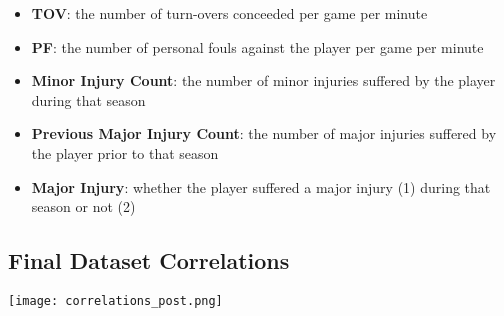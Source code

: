 \documentclass{article}
\begin{document}
\begin{itemize}
    \item \textbf{TOV}: the number of turn-overs conceeded per game per minute
    \item \textbf{PF}: the number of personal fouls against the player per game per minute
    \item \textbf{Minor Injury Count}: the number of minor injuries suffered by the player during that season
    \item \textbf{Previous Major Injury Count}: the number of major injuries suffered by the player prior to that season
    \item \textbf{Major Injury}: whether the player suffered a major injury (1) during that season or not (2)
\end{itemize}

\newpage
\subsection*{Final Dataset Correlations}
\label{appendix:correlations}
\begin{center}
    \texttt{[image: correlations\_post.png]}
\end{center}
\end{document}
